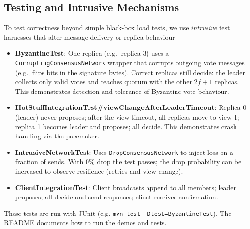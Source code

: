 \documentclass{llncs}
\begin{document}
\subsection{Testing and Intrusive Mechanisms}
\vspace{-0.4em}
To test correctness beyond simple black-box load tests, we use \emph{intrusive} test harnesses that alter message delivery or replica behaviour:
\begin{itemize}
  \setlength{\itemsep}{1pt}\setlength{\parsep}{0pt}\setlength{\topsep}{2pt}
  \item \textbf{ByzantineTest}: One replica (e.g., replica 3) uses a \texttt{CorruptingConsensusNetwork} wrapper that corrupts outgoing vote messages (e.g., flips bits in the signature bytes). Correct replicas still decide: the leader collects only valid votes and reaches quorum with the other $2f+1$ replicas. This demonstrates detection and tolerance of Byzantine vote behaviour.
  \item \textbf{HotStuffIntegrationTest\#viewChangeAfterLeaderTimeout}: Replica 0 (leader) never proposes; after the view timeout, all replicas move to view 1; replica 1 becomes leader and proposes; all decide. This demonstrates crash handling via the pacemaker.
  \item \textbf{IntrusiveNetworkTest}: Uses \texttt{DropConsensusNetwork} to inject loss on a fraction of sends. With 0\% drop the test passes; the drop probability can be increased to observe resilience (retries and view change).
  \item \textbf{ClientIntegrationTest}: Client broadcasts append to all members; leader proposes; all decide and send responses; client receives confirmation.
\end{itemize}

These tests are run with JUnit (e.g. \texttt{mvn test -Dtest=ByzantineTest}). The README documents how to run the demos and tests.
\end{document}
